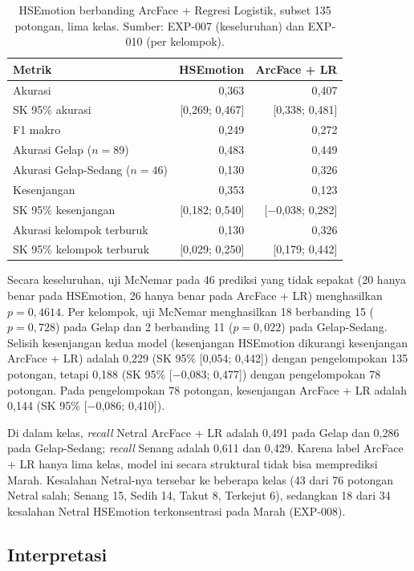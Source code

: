 \begin{table}[htbp]
\centering
\caption[Perbandingan HSEmotion dan ArcFace+Regresi Logistik]{HSEmotion berbanding ArcFace + Regresi Logistik, subset 135 potongan, lima kelas. Sumber: EXP-007 (keseluruhan) dan EXP-010 (per kelompok).}
\label{tab:rq3-comparison}
\begin{tabular}{lrr}
\toprule
Metrik & HSEmotion & ArcFace + LR \\
\midrule
Akurasi & 0,363 & 0,407 \\
SK 95\% akurasi & [0,269; 0,467] & [0,338; 0,481] \\
F1 makro & 0,249 & 0,272 \\
\midrule
Akurasi Gelap ($n = 89$) & 0,483 & 0,449 \\
Akurasi Gelap-Sedang ($n = 46$) & 0,130 & 0,326 \\
Kesenjangan & 0,353 & 0,123 \\
SK 95\% kesenjangan & [0,182; 0,540] & [$-$0,038; 0,282] \\
Akurasi kelompok terburuk & 0,130 & 0,326 \\
SK 95\% kelompok terburuk & [0,029; 0,250] & [0,179; 0,442] \\
\bottomrule
\end{tabular}
\end{table}

Secara keseluruhan, uji McNemar pada 46 prediksi yang tidak sepakat (20 hanya benar pada HSEmotion, 26 hanya benar pada ArcFace + LR) menghasilkan $p = 0,4614$. Per kelompok, uji McNemar menghasilkan 18 berbanding 15 ($p = 0,728$) pada Gelap dan 2 berbanding 11 ($p = 0,022$) pada Gelap-Sedang. Selisih kesenjangan kedua model (kesenjangan HSEmotion dikurangi kesenjangan ArcFace + LR) adalah 0,229 (SK 95\% [0,054; 0,442]) dengan pengelompokan 135 potongan, tetapi 0,188 (SK 95\% [$-$0,083; 0,477]) dengan pengelompokan 78 potongan. Pada pengelompokan 78 potongan, kesenjangan ArcFace + LR adalah 0,144 (SK 95\% [$-$0,086; 0,410]).

Di dalam kelas, \textit{recall} Netral ArcFace + LR adalah 0,491 pada Gelap dan 0,286 pada Gelap-Sedang; \textit{recall} Senang adalah 0,611 dan 0,429. Karena label ArcFace + LR hanya lima kelas, model ini secara struktural tidak bisa memprediksi Marah. Kesalahan Netral-nya tersebar ke beberapa kelas (43 dari 76 potongan Netral salah; Senang 15, Sedih 14, Takut 8, Terkejut 6), sedangkan 18 dari 34 kesalahan Netral HSEmotion terkonsentrasi pada Marah (EXP-008).

\subsection*{Interpretasi}

